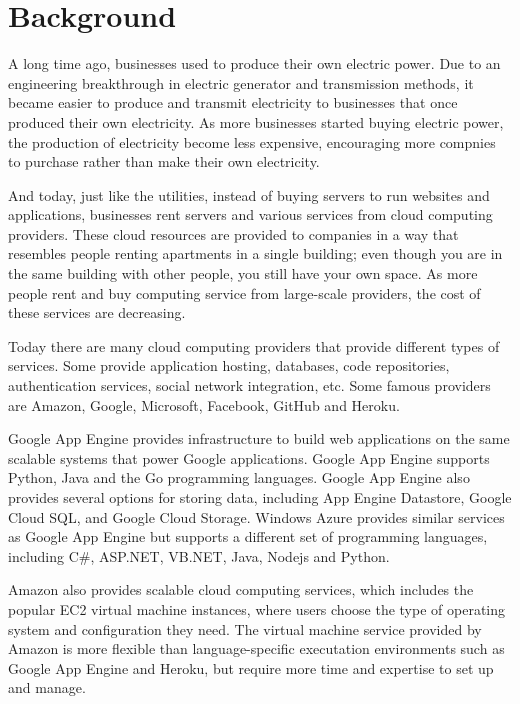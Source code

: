 
\section{Background}

A long time ago, businesses used to produce their own electric power.  Due to an engineering breakthrough in electric generator and transmission methods, it became easier to produce and transmit electricity to businesses that once produced their own electricity. As more businesses started buying electric power, the production of electricity become less expensive, encouraging more compnies to purchase rather than make their own electricity.

And today, just like the utilities, instead of buying servers to run websites and applications, businesses rent servers and various services from cloud computing providers. These cloud resources are provided to companies in a way that resembles people renting apartments in a single building; even though you are in the same building with other people, you still have your own space. As more people rent and buy computing service from large-scale providers, the cost of these services are decreasing. 

Today there are many cloud computing providers that provide different types of services. Some provide application hosting, databases, code repositories, authentication services, social network integration, etc.  Some famous providers are Amazon, Google, Microsoft, Facebook, GitHub and Heroku. 

Google App Engine provides infrastructure to build web applications on the same scalable systems that power Google applications.  Google App Engine supports Python, Java and the Go programming languages. Google App Engine also provides several options for storing data, including App Engine Datastore, Google Cloud SQL, and Google Cloud Storage. Windows Azure provides similar services as Google App Engine but supports a different set of programming languages, including C#, ASP.NET, VB.NET, Java, Nodejs and Python.

Amazon also provides scalable cloud computing services, which includes the popular EC2 virtual machine instances, where users choose the type of operating system and configuration they need. The virtual machine service provided by Amazon is more flexible than language-specific executation environments such as Google App Engine and Heroku, but require more time and expertise to set up and manage. 

